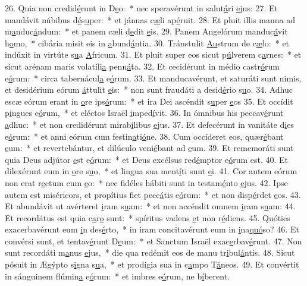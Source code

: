 26. Quia non credid\uline{é}runt in D\uline{e}o:~* nec speravérunt in salut\uline{á}ri \uline{e}jus:
27. Et mandávit núbibus d\uline{é}s\uline{u}per:~* et jánuas c\uline{æ}li ap\uline{é}ruit.
28. Et pluit illis manna ad m\uline{a}nduc\uline{á}ndum:~* et panem cæli d\uline{e}dit \uline{e}is.
29. Panem Angelórum manduc\uline{á}vit h\uline{o}mo,~* cibária misit eis in \uline{a}bund\uline{á}ntia.
30. Tránstulit \uline{Au}strum de c\uline{æ}lo:~* et indúxit in virtúte s\uline{u}a \uline{A}fricum.
31. Et pluit super eos sicut p\uline{ú}lverem c\uline{a}rnes:~* et sicut arénam maris volatíli\uline{a} penn\uline{á}ta.
32. Et cecidérunt in médio castr\uline{ó}rum e\uline{ó}rum:~* circa tabernácul\uline{a} e\uline{ó}rum.
33. Et manducavérunt, et saturáti sunt nimis, et desidérium eórum \uline{á}ttulit \uline{e}is:~* non sunt fraudáti a desid\uline{é}rio s\uline{u}o.
34. Adhuc escæ eórum erant in \uline{o}re ips\uline{ó}rum:~* et ira Dei ascéndit s\uline{u}per \uline{e}os
35. Et occídit p\uline{i}ngues e\uline{ó}rum,~* et eléctos Israël \uline{i}mped\uline{í}vit.
36. In ómnibus his peccav\uline{é}runt \uline{a}dhuc:~* et non credidérunt mirab\uline{í}libus \uline{e}jus.
37. Et defecérunt in vanitáte d\uline{i}es e\uline{ó}rum:~* et anni eórum cum festin\uline{a}ti\uline{ó}ne.
38. Cum occíderet eos, quær\uline{é}bant \uline{e}um:~* et revertebántur, et dilúculo veni\uline{é}bant ad \uline{e}um.
39. Et rememoráti sunt quia Deus adjútor \uline{e}st e\uline{ó}rum:~* et Deus excélsus red\uline{é}mptor e\uline{ó}rum est.
40. Et dilexérunt eum in \uline{o}re s\uline{u}o,~* et lingua sua ment\uline{í}ti sunt \uline{e}i.
41. Cor autem eórum non erat r\uline{e}ctum cum \uline{e}o:~* nec fidéles hábiti sunt in testam\uline{é}nto \uline{e}jus.
42. Ipse autem est miséricors, et propítius fiet pecc\uline{á}tis e\uline{ó}rum:~* et non disp\uline{é}rdet \uline{e}os.
43. Et abundávit ut avérteret \uline{i}ram s\uline{u}am:~* et non accéndit omnem \uline{i}ram s\uline{u}am:
44. Et recordátus est quia c\uline{a}r\uline{o} sunt:~* spíritus vadens \uline{e}t non r\uline{é}diens.
45. Quóties exacerbavérunt eum \uline{i}n des\uline{é}rto,~* in iram concitavérunt eum in \uline{i}na\uline{quó}so?
46. Et convérsi sunt, et tentav\uline{é}runt D\uline{e}um:~* et Sanctum Israël exac\uline{e}rbav\uline{é}runt.
47. Non sunt recordáti m\uline{a}nus \uline{e}jus,~* die qua redémit eos de manu tr\uline{i}bul\uline{á}ntis.
48. Sicut pósuit in Ægýpto s\uline{i}gna s\uline{u}a,~* et prodígia sua in c\uline{a}mpo T\uline{á}neos.
49. Et convértit in sánguinem flúmin\uline{a} e\uline{ó}rum:~* et imbres e\uline{ó}rum, ne b\uline{í}berent.
